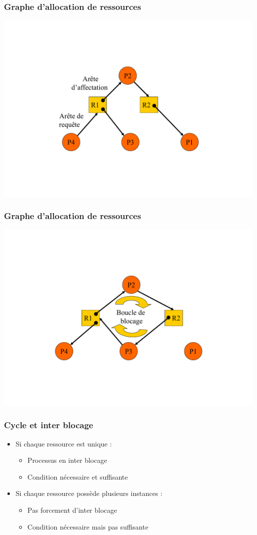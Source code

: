 \begin{frame}
\frametitle{Graphe d’allocation de ressources}
\includegraphics[width=.8\textwidth]{../illustration/graphe_alloc_ressource.pdf}
\end{frame}

\begin{frame}
\frametitle{Graphe d’allocation de ressources}
\includegraphics[width=.8\textwidth]{../illustration/graphe_alloc_ressource_ib.pdf}
\end{frame}

\begin{frame}
\frametitle{Cycle et inter blocage}
\begin{itemize}
\item Si chaque ressource est unique :
\begin{itemize}
\item Processus en inter blocage
\item Condition nécessaire et suffisante
\end{itemize}
\item Si chaque ressource possède plusieurs instances :
\begin{itemize}
\item Pas forcement d’inter blocage
\item Condition nécessaire mais pas suffisante
\end{itemize}
\end{itemize}
\end{frame}

